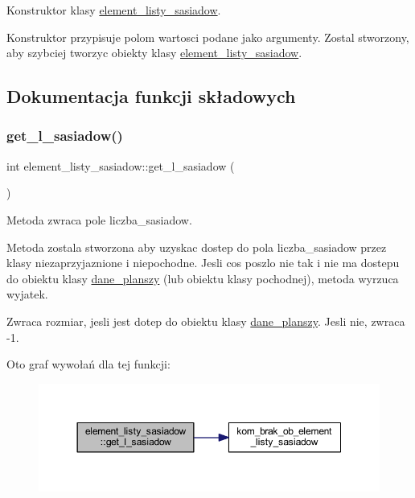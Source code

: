 Konstruktor klasy \mbox{\hyperlink{classelement__listy__sasiadow}{element\+\_\+listy\+\_\+sasiadow}}.

Konstruktor przypisuje polom wartosci podane jako argumenty. Zostal stworzony, aby szybciej tworzyc obiekty klasy \mbox{\hyperlink{classelement__listy__sasiadow}{element\+\_\+listy\+\_\+sasiadow}}. 

\subsection{Dokumentacja funkcji składowych}
\mbox{\label{classelement__listy__sasiadow_ac55cdbf69f59c40f2003827b71b8d702}} 
\subsubsection{\texorpdfstring{get\+\_\+l\+\_\+sasiadow()}{get\_l\_sasiadow()}}
{\footnotesize\ttfamily int element\+\_\+listy\+\_\+sasiadow\+::get\+\_\+l\+\_\+sasiadow (\begin{DoxyParamCaption}{ }\end{DoxyParamCaption})}

Metoda zwraca pole liczba\+\_\+sasiadow.

Metoda zostala stworzona aby uzyskac dostep do pola liczba\+\_\+sasiadow przez klasy niezaprzyjaznione i niepochodne. Jesli cos poszlo nie tak i nie ma dostepu do obiektu klasy \mbox{\hyperlink{classdane__planszy}{dane\+\_\+planszy}} (lub obiektu klasy pochodnej), metoda wyrzuca wyjatek. \begin{DoxyReturn}{Zwraca}
rozmiar, jesli jest dotep do obiektu klasy \mbox{\hyperlink{classdane__planszy}{dane\+\_\+planszy}}. Jesli nie, zwraca -\/1. 
\end{DoxyReturn}
Oto graf wywołań dla tej funkcji\+:
\nopagebreak
\begin{figure}[H]
\begin{center}
\leavevmode
\includegraphics[width=350pt]{classelement__listy__sasiadow_ac55cdbf69f59c40f2003827b71b8d702_cgraph}
\end{center}
\end{figure}
\mbox{\label{classelement__listy__sasiadow_a2c1eabc63e606d142bcf66c648b0e9d0}} 
